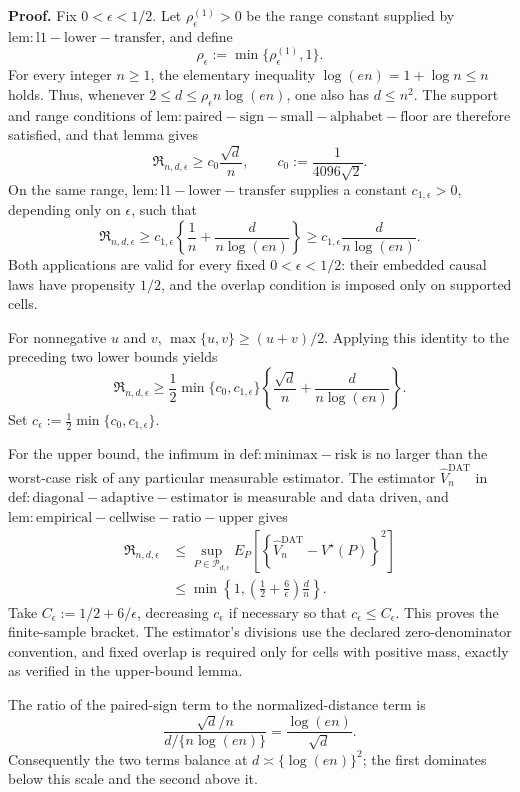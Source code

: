 \textbf{Proof.}
Fix \(0<\epsilon<1/2\).  Let \(\rho_\epsilon^{(1)}>0\) be the range constant supplied by \(\mathrm{lem:l1-lower-transfer}\), and define
\[
 \rho_\epsilon:=\min\{\rho_\epsilon^{(1)},1\}.
\]
For every integer \(n\ge1\), the elementary inequality \(\log(en)=1+\log n\le n\) holds.  Thus, whenever
\(2\le d\le\rho_\epsilon n\log(en)\), one also has \(d\le n^2\).  The support and range conditions of \(\mathrm{lem:paired-sign-small-alphabet-floor}\) are therefore satisfied, and that lemma gives
\[
 \mathfrak R_{n,d,\epsilon}
 \ge c_0\frac{\sqrt d}{n},
 \qquad
 c_0:=\frac1{4096\sqrt2}.
\]
On the same range, \(\mathrm{lem:l1-lower-transfer}\) supplies a constant \(c_{1,\epsilon}>0\), depending only on \(\epsilon\), such that
\[
 \mathfrak R_{n,d,\epsilon}
 \ge c_{1,\epsilon}
 \left\{\frac1n+\frac d{n\log(en)}\right\}
 \ge c_{1,\epsilon}\frac d{n\log(en)}.
\]
Both applications are valid for every fixed \(0<\epsilon<1/2\): their embedded causal laws have propensity \(1/2\), and the overlap condition is imposed only on supported cells.

For nonnegative \(u\) and \(v\), \(\max\{u,v\}\ge(u+v)/2\).  Applying this identity to the preceding two lower bounds yields
\[
 \mathfrak R_{n,d,\epsilon}
 \ge \frac12\min\{c_0,c_{1,\epsilon}\}
 \left\{\frac{\sqrt d}{n}+\frac d{n\log(en)}\right\}.
\]
Set \(c_\epsilon:=\frac12\min\{c_0,c_{1,\epsilon}\}\).

For the upper bound, the infimum in \(\mathrm{def:minimax-risk}\) is no larger than the worst-case risk of any particular measurable estimator.  The estimator \(\widehat V_n^{\mathrm{DAT}}\) in \(\mathrm{def:diagonal-adaptive-estimator}\) is measurable and data driven, and \(\mathrm{lem:empirical-cellwise-ratio-upper}\) gives
\[
 \begin{aligned}
 \mathfrak R_{n,d,\epsilon}
 &\le \sup_{P\in\mathcal P_{d,\epsilon}}
 E_P\!\left[
  \left\{\widehat V_n^{\mathrm{DAT}}-V^\star(P)\right\}^2
 \right]\\
 &\le \min\!\left\{1,
   \left(\frac12+\frac6\epsilon\right)\frac dn
  \right\}.
 \end{aligned}
\]
Take \(C_\epsilon:=1/2+6/\epsilon\), decreasing \(c_\epsilon\) if necessary so that \(c_\epsilon\le C_\epsilon\).  This proves the finite-sample bracket.  The estimator's divisions use the declared zero-denominator convention, and fixed overlap is required only for cells with positive mass, exactly as verified in the upper-bound lemma.

The ratio of the paired-sign term to the normalized-distance term is
\[
 \frac{\sqrt d/n}{d/\{n\log(en)\}}
 =\frac{\log(en)}{\sqrt d}.
\]
Consequently the two terms balance at \(d\asymp\{\log(en)\}^2\); the first dominates below this scale and the second above it.

